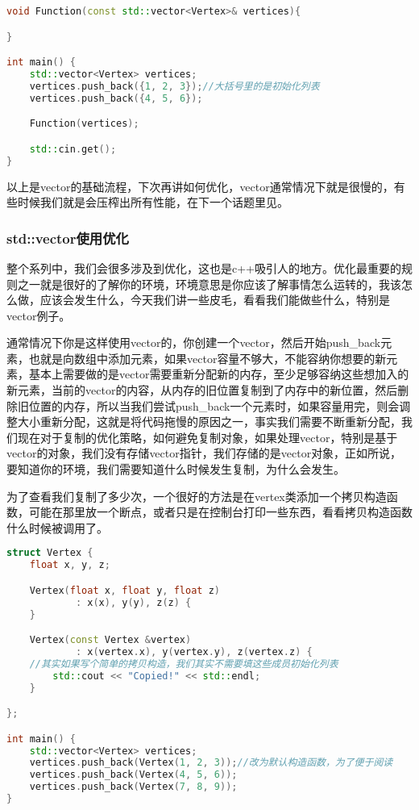 \begin{lstlisting}[language=c++]
void Function(const std::vector<Vertex>& vertices){

}

int main() {
    std::vector<Vertex> vertices;
    vertices.push_back({1, 2, 3});//大括号里的是初始化列表
    vertices.push_back({4, 5, 6});

    Function(vertices);

    std::cin.get();
}
\end{lstlisting}

以上是{\ncodestyle vector}的基础流程，下次再讲如何优化，{\ncodestyle vector}通常情况下就是很慢的，有些时候我们就是会压榨出所有性能，在下一个话题里见。



\subsubsection{std::vector使用优化}

整个系列中，我们会很多涉及到优化，这也是c++吸引人的地方。优化最重要的规则之一就是很好的了解你的环境，环境意思是你应该了解事情怎么运转的，我该怎么做，应该会发生什么，今天我们讲一些皮毛，看看我们能做些什么，特别是{\ncodestyle vector}例子。

通常情况下你是这样使用{\ncodestyle vector}的，你创建一个{\ncodestyle vector}，然后开始{\ncodestyle push_back}元素，也就是向数组中添加元素，如果{\ncodestyle vector}容量不够大，不能容纳你想要的新元素，基本上需要做的是{\ncodestyle vector}需要重新分配新的内存，至少足够容纳这些想加入的新元素，当前的{\ncodestyle vector}的内容，从内存的旧位置复制到了内存中的新位置，然后删除旧位置的内存，所以当我们尝试push_back一个元素时，如果容量用完，则会调整大小重新分配，这就是将代码拖慢的原因之一，事实我们需要不断重新分配，我们现在对于复制的优化策略，如何避免复制对象，如果处理{\ncodestyle vector}，特别是基于{\ncodestyle vector}的对象，我们没有存储{\ncodestyle vector}指针，我们存储的是{\ncodestyle vector}对象，正如所说，要知道你的环境，我们需要知道什么时候发生复制，为什么会发生。

为了查看我们复制了多少次，一个很好的方法是在{\ncodestyle vertex}类添加一个拷贝构造函数，可能在那里放一个断点，或者只是在控制台打印一些东西，看看拷贝构造函数什么时候被调用了。

\begin{lstlisting}[language=c++]
struct Vertex {
    float x, y, z;

    Vertex(float x, float y, float z)
            : x(x), y(y), z(z) {
    }

    Vertex(const Vertex &vertex)
            : x(vertex.x), y(vertex.y), z(vertex.z) {
    //其实如果写个简单的拷贝构造，我们其实不需要填这些成员初始化列表
        std::cout << "Copied!" << std::endl;
    }

};

int main() {
    std::vector<Vertex> vertices;
    vertices.push_back(Vertex(1, 2, 3));//改为默认构造函数，为了便于阅读
    vertices.push_back(Vertex(4, 5, 6));
    vertices.push_back(Vertex(7, 8, 9));
}
\end{lstlisting}

